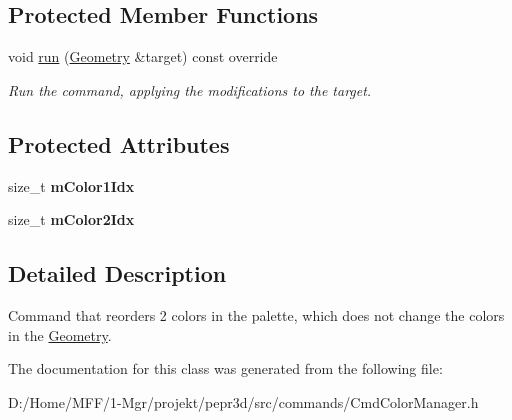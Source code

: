 \subsection*{Protected Member Functions}
\begin{DoxyCompactItemize}
\item 
\mbox{\label{classpepr3d_1_1_cmd_color_manager_reorder_colors_a10fd4859ee24045dab33287150fb2573}} 
void \mbox{\hyperlink{classpepr3d_1_1_cmd_color_manager_reorder_colors_a10fd4859ee24045dab33287150fb2573}{run}} (\mbox{\hyperlink{classpepr3d_1_1_geometry}{Geometry}} \&target) const override
\begin{DoxyCompactList}\small\item\em Run the command, applying the modifications to the target. \end{DoxyCompactList}\end{DoxyCompactItemize}
\subsection*{Protected Attributes}
\begin{DoxyCompactItemize}
\item 
\mbox{\label{classpepr3d_1_1_cmd_color_manager_reorder_colors_af50083a6f91b8cd5e105ad3e0a572630}} 
size\+\_\+t {\bfseries m\+Color1\+Idx}
\item 
\mbox{\label{classpepr3d_1_1_cmd_color_manager_reorder_colors_ab20fc791088ea8c6e73cc809f57fce1b}} 
size\+\_\+t {\bfseries m\+Color2\+Idx}
\end{DoxyCompactItemize}


\subsection{Detailed Description}
Command that reorders 2 colors in the palette, which does not change the colors in the \mbox{\hyperlink{classpepr3d_1_1_geometry}{Geometry}}. 

The documentation for this class was generated from the following file\+:\begin{DoxyCompactItemize}
\item 
D\+:/\+Home/\+M\+F\+F/1-\/\+Mgr/projekt/pepr3d/src/commands/Cmd\+Color\+Manager.\+h\end{DoxyCompactItemize}
